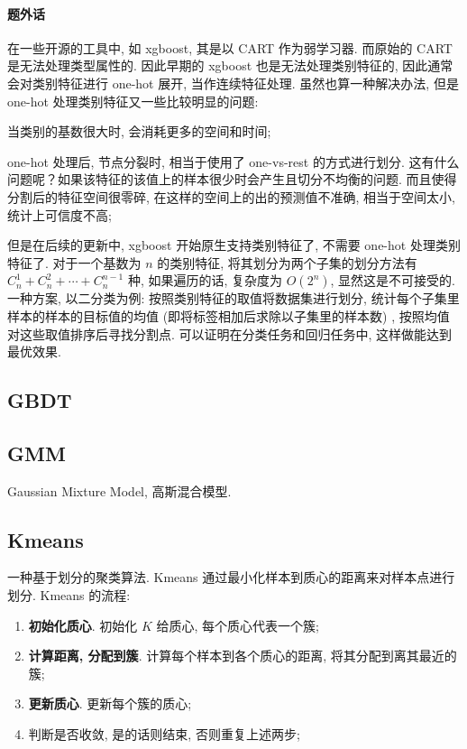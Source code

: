 \paragraph{题外话}
在一些开源的工具中, 如 xgboost, 其是以 CART 作为弱学习器. 而原始的 CART 是无法处理类型属性的. 因此早期的 xgboost 也是无法处理类别特征的, 因此通常会对类别特征进行 one-hot 展开, 当作连续特征处理. 虽然也算一种解决办法, 但是 one-hot 处理类别特征又一些比较明显的问题: 
\begin{myitemize}
	\item 当类别的基数很大时, 会消耗更多的空间和时间; 
	
	\item one-hot 处理后, 节点分裂时, 相当于使用了 one-vs-rest 的方式进行划分. 这有什么问题呢？如果该特征的该值上的样本很少时会产生且切分不均衡的问题. 而且使得分割后的特征空间很零碎, 在这样的空间上的出的预测值不准确, 相当于空间太小, 统计上可信度不高; 
\end{myitemize}

但是在后续的更新中, xgboost 开始原生支持类别特征了, 不需要 one-hot 处理类别特征了. 对于一个基数为 $n$ 的类别特征, 将其划分为两个子集的划分方法有 $C_n^1 + C_n^2 + \cdots +C_n^{n-1}$ 种, 如果遍历的话, 复杂度为 $O(2^n)$, 显然这是不可接受的. 一种方案, 以二分类为例: 按照类别特征的取值将数据集进行划分, 统计每个子集里样本的样本的目标值的均值 (即将标签相加后求除以子集里的样本数) , 按照均值对这些取值排序后寻找分割点. 可以证明在分类任务和回归任务中, 这样做能达到最优效果. 

\subsection{GBDT}

\subsection{GMM}
Gaussian Mixture Model, 高斯混合模型. 

\subsection{Kmeans}
一种基于划分的聚类算法. Kmeans 通过最小化样本到质心的距离来对样本点进行划分. Kmeans 的流程:
\begin{enumerate}
	\item \textbf{初始化质心}. 初始化 $K$ 给质心, 每个质心代表一个簇;
	
	\item \textbf{计算距离, 分配到簇}. 计算每个样本到各个质心的距离, 将其分配到离其最近的簇;
	
	\item \textbf{更新质心}. 更新每个簇的质心;
	
	\item 判断是否收敛, 是的话则结束, 否则重复上述两步;
\end{enumerate}


